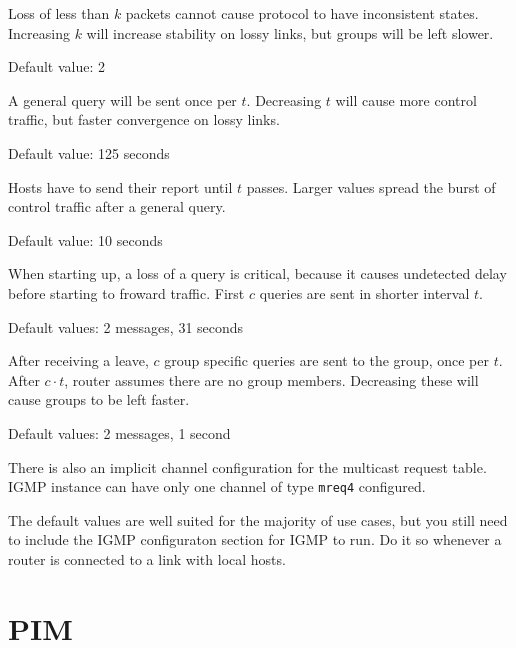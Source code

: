 \begin{description}[style=nextline]
\item[Robustness $k$]
  Loss of less than $k$ packets cannot cause protocol to have inconsistent
  states. Increasing $k$ will increase stability on lossy links, but groups
  will be left slower.

  Default value: 2

\item[Query interval $t$]
  A general query will be sent once per $t$. Decreasing $t$ will cause more
  control traffic, but faster convergence on lossy links.

  Default value: 125 seconds

\item[Query response interval $t$]
  Hosts have to send their report until $t$ passes. Larger values spread the
  burst of control traffic after a general query.

  Default value: 10 seconds

\item[Startup query count $c$, startup query interval $t$]
  When starting up, a loss of a query is critical, because it causes undetected
  delay before starting to froward traffic. First $c$ queries are sent in
  shorter interval $t$.

  Default values: 2 messages, 31 seconds

\item[Last member query count $c$, last member query interval $t$]
  After receiving a leave, $c$ group specific queries are sent to the group,
  once per $t$. After $c\cdot t$, router assumes there are no group members.
  Decreasing these will cause groups to be left faster.

  Default values: 2 messages, 1 second

\end{description}

There is also an implicit channel configuration for the multicast request
table. IGMP instance can have only one channel of type \texttt{mreq4}
configured.

The default values are well suited for the majority of use cases, but you still
need to include the IGMP configuraton section for IGMP to run. Do it so
whenever a router is connected to a link with local hosts.

\section{PIM}




